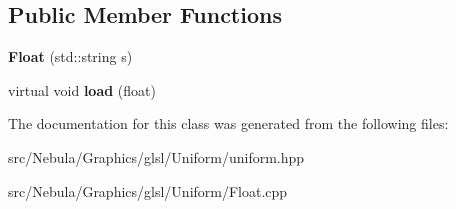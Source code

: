 \subsection*{\-Public \-Member \-Functions}
\begin{DoxyCompactItemize}
\item 
\hypertarget{classNeb_1_1glsl_1_1Uniform_1_1Scalar_1_1Float_a98cbc3f3264a8c007ae4bc942a0e552a}{{\bfseries \-Float} (std\-::string s)}\label{classNeb_1_1glsl_1_1Uniform_1_1Scalar_1_1Float_a98cbc3f3264a8c007ae4bc942a0e552a}

\item 
\hypertarget{classNeb_1_1glsl_1_1Uniform_1_1Scalar_1_1Float_a3e02efd7a02e8714a89dff10459dc47b}{virtual void {\bfseries load} (float)}\label{classNeb_1_1glsl_1_1Uniform_1_1Scalar_1_1Float_a3e02efd7a02e8714a89dff10459dc47b}

\end{DoxyCompactItemize}


\-The documentation for this class was generated from the following files\-:\begin{DoxyCompactItemize}
\item 
src/\-Nebula/\-Graphics/glsl/\-Uniform/uniform.\-hpp\item 
src/\-Nebula/\-Graphics/glsl/\-Uniform/\-Float.\-cpp\end{DoxyCompactItemize}
